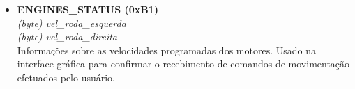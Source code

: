 \begin{itemize}
\begin{itemize}
      \item \textbf{ENGINES\_STATUS (0xB1)} \\
	\textit{(byte) vel\_roda\_esquerda}\\
	\textit{(byte) vel\_roda\_direita}\\
	Informações sobre as velocidades programadas dos motores. Usado na interface gráfica para confirmar o recebimento de comandos de movimentação efetuados pelo usuário.

	

    \end{itemize}
\end{itemize}
